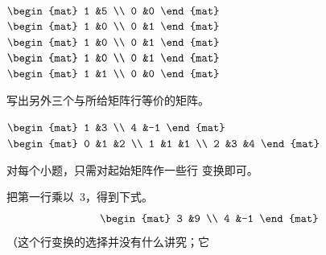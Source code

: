 \begin{exercises}
\begin{answer}
\begin{exparts*}
        \partsitem
          \(\begin{mat}
              1  &5  \\
              0  &0
            \end{mat} \)
        \partsitem
          \(\begin{mat}
             1   &0  \\
             0   &1
            \end{mat} \)
        \partsitem
          \(\begin{mat}
             1   &0  \\
             0   &1
            \end{mat} \)
        \partsitem
          \(\begin{mat}
             1   &0  \\
             0   &1
            \end{mat} \)
        \partsitem
          \(\begin{mat}
             1   &1  \\
             0   &0
            \end{mat} \)
      \end{exparts*}
    \end{answer}
 \item 写出另外三个与所给矩阵行等价的矩阵。
   \begin{exparts*}
     \partsitem 
       \(\begin{mat}
           1 &3 \\
           4 &-1
         \end{mat}\)
     \partsitem
       \(\begin{mat}
           0 &1 &2 \\
           1 &1 &1  \\
           2 &3 &4
         \end{mat}\)
   \end{exparts*}
   \begin{answer}
     对每个小题，只需对起始矩阵作一些行
     变换即可。
      \begin{exparts}
        \partsitem
          把第一行乘以~$3$，得到下式。
          \begin{equation*}
            \begin{mat}
              3 &9  \\
              4 &-1
            \end{mat}
          \end{equation*}
          （这个行变换的选择并没有什么讲究；它 

\end{exparts}
\end{answer}
\end{exercises}
